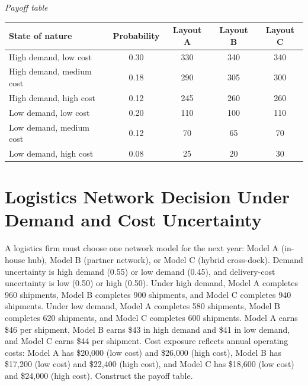 \begin{ExamProblems}
\begin{center}
		\end{center}
		\begin{center}
			\textit{Payoff table} \\
			\begin{tabular}{l c c c c}
				\toprule
				State of nature & Probability & Layout A & Layout B & Layout C \\
				\midrule
				High demand, low cost & 0.30 & 330 & 340 & 340 \\
				High demand, medium cost & 0.18 & 290 & 305 & 300 \\
				High demand, high cost & 0.12 & 245 & 260 & 260 \\
				Low demand, low cost & 0.20 & 110 & 100 & 110 \\
				Low demand, medium cost & 0.12 & 70 & 65 & 70 \\
				Low demand, high cost & 0.08 & 25 & 20 & 30 \\
				\bottomrule
			\end{tabular}
		\end{center}
		
		\item
		\section{Logistics Network Decision Under Demand and Cost Uncertainty}
		A logistics firm must choose one network model for the next year: Model A (in-house hub),
		Model B (partner network), or Model C (hybrid cross-dock). Demand uncertainty is high demand (0.55)
		or low demand (0.45), and delivery-cost uncertainty is low (0.50) or high (0.50).
		Under high demand, Model A completes 960 shipments, Model B completes 900 shipments, and Model C completes 940 shipments.
		Under low demand, Model A completes 580 shipments, Model B completes 620 shipments, and Model C completes 600 shipments.
		Model A earns \$46 per shipment, Model B earns \$43 in high demand and \$41 in low demand,
		and Model C earns \$44 per shipment. Cost exposure reflects annual operating costs:
		Model A has \$20{,}000 (low cost) and \$26{,}000 (high cost),
		Model B has \$17{,}200 (low cost) and \$22{,}400 (high cost), and
		Model C has \$18{,}600 (low cost) and \$24{,}000 (high cost).
		Construct the payoff table.
		

\end{ExamProblems}
